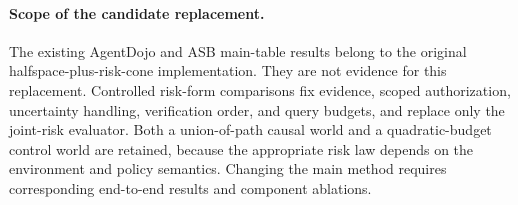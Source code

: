 \paragraph{Scope of the candidate replacement.}
The existing AgentDojo and ASB main-table results belong to the original
halfspace-plus-risk-cone implementation. They are not evidence for this
replacement. Controlled risk-form comparisons fix evidence, scoped
authorization, uncertainty handling, verification order, and query budgets,
and replace only the joint-risk evaluator. Both a union-of-path causal world
and a quadratic-budget control world are retained, because the appropriate
risk law depends on the environment and policy semantics. Changing the main
method requires corresponding end-to-end results and component ablations.
